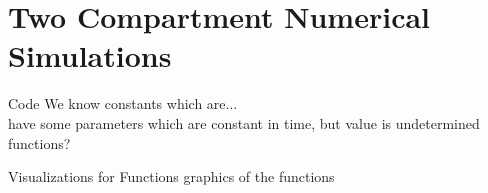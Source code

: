 \section{Two Compartment Numerical Simulations}

\begin{frame}{Code}
	We know constants which are...\\
    have some parameters which are constant in time, but value is undetermined\\
    functions?
\end{frame}

\begin{frame}{Visualizations for Functions}
    graphics of the functions
\end{frame}